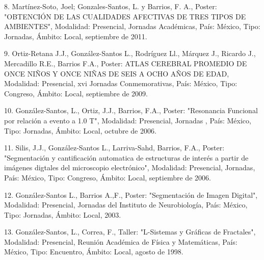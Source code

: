 8. Martínez-Soto, Joel; Gonzales-Santos, L. y Barrios, F. A., Poster: "OBTENCIÓN DE LAS CUALIDADES 
AFECTIVAS DE TRES TIPOS DE AMBIENTES", Modalidad: Presencial, Jornadas Académicas, País: México, 
Tipo: Jornadas, Ámbito: Local, septiembre de 2011.

9. Ortiz-Retana J.J., González-Santos L., Rodríguez Ll., Márquez J., Ricardo J., Mercadillo R.E., 
Barrios F.A., Poster: ATLAS CEREBRAL PROMEDIO DE ONCE NIÑOS Y ONCE NIÑAS DE SEIS A OCHO AÑOS DE 
EDAD, Modalidad: Presencial, xvi Jornadas Conmemorativas, País: México, Tipo: Congreso, Ámbito: 
Local, septiembre de 2009.

10. González-Santos, L., Ortiz, J.J., Barrios, F.A., Poster: "Resonancia Funcional por relación a 
evento a 1.0 T", Modalidad: Presencial, Jornadas , País: México, Tipo: Jornadas, Ámbito: Local, 
octubre de 2006.

11. Silis, J.J., González-Santos L., Larriva-Sahd, Barrios, F.A., Poster: "Segmentación y 
cantificación automatica de estructuras de interés a partir de imágenes digtales del microscopio 
electrónico", Modalidad: Presencial, Jornadas, País: México, Tipo: Congreso, Ámbito: Local, 
septiembre de 2006.

12. González-Santos L., Barrios A.,F., Poster: "Segmentación de Imagen Digital", Modalidad: 
Presencial, Jornadas del Instituto de Neurobiología, País: México, Tipo: Jornadas, Ámbito: Local, 
2003.

13. González-Santos, L., Correa, F., Taller: "L-Sistemas y Gráficas de Fractales", Modalidad: 
Presencial, Reunión Académica de Física y Matemáticas, País: México, Tipo: Encuentro, Ámbito: Local, 
agosto de 1998.


